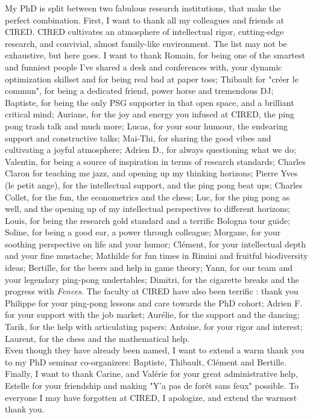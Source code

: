 My PhD is split between two fabulous research institutions, that make the perfect combination.
First, I want to thank all my colleagues and friends at CIRED. CIRED cultivates an atmosphere of intellectual rigor, cutting-edge research, and convivial, almost family-like environment. The list may not be exhaustive, but here goes. 
%
I want to thank Romain, for being one of the smartest and funniest people I've shared a desk and conferences with, your dynamic optimization skillset and for being real bad at paper toss; Thibault for "créer le commun", for being a dedicated friend, power horse and tremendous DJ; Baptiste, for being the only PSG supporter in that open space, and a brilliant critical mind;  Auriane, for the joy and energy you infused at CIRED, the ping pong trash talk and much more; Lucas, for your sour humour, the endearing support and constructive talks; Mai-Thi, for sharing the good vibes and cultivating a joyful atmosphere; Adrien D., for always questioning what we do; Valentin, for being a source of inspiration in terms of research standards; Charles Claron
for teaching me jazz, and opening up my thinking horizons; Pierre Yves (le petit ange), for the intellectual support, and the ping pong beat ups; Charles Collet, for the fun, the econometrics and the chess; Luc, for the ping pong as well, and the opening up of my intellectual perspectives to different horizons; Louis, for being the research gold standard and a terrific Bologna tour guide; Soline, for being a good ear, a power through colleague; Morgane, for your soothing perspective on life and your humor; Clément, for your intellectual depth and your fine mustache; Mathilde for fun times in Rimini and fruitful biodiversity ideas; Bertille, for the beers and help in game theory; Yann, for our team and your legendary ping-pong undertables; Dimitri, for the cigarette breaks and the progress with \textit{Fences}. The faculty at CIRED have also been terrific : thank you Philippe for your ping-pong lessons and care towards the PhD cohort; Adrien F. for your support with the job market; Aurélie, for the support and the dancing; Tarik, for the help with articulating papers; Antoine, for your rigor and interest; Laurent, for the chess and the mathematical help. 
\\
Even though they have already been named, I want to extend a warm thank you to my  PhD seminar co-organizers: Baptiste, Thibault, Clément and Bertille. \\
Finally, I want to thank Carine, and Valérie for your great administrative help, Estelle for your friendship and making "Y'a pas de forêt sans feux" possible. To everyone I may have forgotten at CIRED, I apologize, and extend the warmest thank you. 


